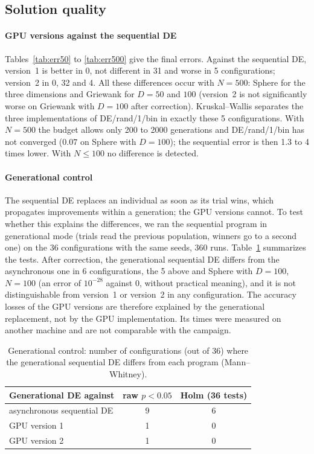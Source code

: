 \documentclass[conference]{IEEEtran}
\begin{document}
\subsection{Solution quality}\label{sec:quality}
\paragraph{GPU versions against the sequential DE} Tables~\ref{tab:err50} to \ref{tab:err500}
give the final errors. Against the sequential DE, version~1 is better in 0, not different in
31 and worse in 5 configurations; version~2 in 0, 32 and 4. All these differences occur with
$N=500$: Sphere for the three dimensions and Griewank for $D=50$ and $100$ (version~2 is not
significantly worse on Griewank with $D=100$ after correction). Kruskal--Wallis separates the
three implementations of DE/rand/1/bin in exactly these 5 configurations. With $N=500$ the
budget allows only 200 to 2000 generations and DE/rand/1/bin has not converged
($0.07$ on Sphere with $D=100$); the sequential error is then 1.3 to 4 times lower. With
$N\le100$ no difference is detected.

\paragraph{Generational control} The sequential DE replaces an individual as soon as its trial
wins, which propagates improvements within a generation; the GPU versions cannot. To test whether
this explains the differences, we ran the sequential program in generational mode (trials read
the previous population, winners go to a second one) on the 36 configurations with the same
seeds, 360 runs. Table~\ref{tab:gen} summarizes the tests. After correction, the generational
sequential DE differs from the asynchronous one in 6 configurations, the 5 above and Sphere with
$D=100$, $N=100$ (an error of $10^{-28}$ against 0, without practical meaning), and it is not
distinguishable from version~1 or version~2 in any configuration. The accuracy losses of the
GPU versions are therefore explained by the generational replacement, not by the GPU
implementation. Its times were measured on another machine and are not comparable with the
campaign.

\begin{table}[!t]
\centering
\caption{Generational control: number of configurations (out of 36) where the generational
sequential DE differs from each program (Mann--Whitney).}
\label{tab:gen}
\footnotesize
\begin{tabular}{lcc}
\toprule
Generational DE against & raw $p<0.05$ & Holm (36 tests)\\
\midrule
asynchronous sequential DE & 9 & 6\\
GPU version 1 & 1 & 0\\
GPU version 2 & 1 & 0\\
\bottomrule
\end{tabular}
\end{table}
\end{document}
